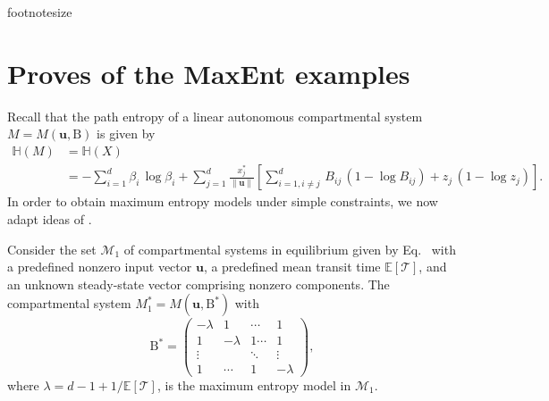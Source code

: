 \documentclass[smallextended]{svjour3}
\makeatletter
\renewcommand*{\eqref}[1]{%
  \hyperref[{#1}]{\textup{\tagform@{\ref*{#1}}}}%
}
\renewcommand{\tens}[1]{\mathrm{#1}}
\renewcommand{\vec}[1]{\mathbf{#1}}
\newcommand{\E}{\mathbb{E}}
\newcommand{\TT}{\mathcal{T}}
\renewcommand{\H}{\mathbb{H}}
\newcommand{\suml}{\sum\limits}
\newcommand{\vnorms}[1]{\|#1\|}
\makeatother
\begin{document}
% 

{footnotesize
}


\appendix


\section{Proves of the MaxEnt examples}
	Recall that the path entropy of a linear autonomous compartmental system $M=M(\vec{u},\tens{B})$ is given by
	\begin{equation}
    \begin{aligned}
      \H(M) &= \H(X)\\
      &= -\suml_{i=1}^d\beta_i\,\log\beta_i + \suml_{j=1}^d \frac{x^\ast_j}{\vnorms{\vec{u}}}\left[\suml_{i=1,i\neq j}^d \,B_{ij}\,(1-\log B_{ij}) + z_j\,(1-\log z_j)\right].
    \end{aligned}
	\end{equation}
	In order to obtain maximum entropy models under simple constraints, we now adapt ideas of \cite{Girardin2004MCAP}.

	\begin{myproposition}
    \label{proposition:max_ent_example_1}
		Consider the set $\mathcal{M}_1$ of compartmental systems in equilibrium given by Eq.~\eqref{eqn:lin_CS_sys}  with a predefined nonzero input vector $\vec{u}$, a predefined mean transit time $\E\left[\TT\right]$, and an unknown steady-state vector comprising nonzero components.
		The compartmental system $M^\ast_1=M(\vec{u},\tens{B}^\ast)$ with 
		\begin{equation}
			\tens{B}^\ast = \begin{pmatrix}
									-\lambda & 1 & \cdots & 1\\
									1 & -\lambda & 1 \cdots & 1 \\
									\vdots & & \ddots & \vdots\\
									1 & \cdots & 1 & -\lambda
             \end{pmatrix},
		\end{equation}
		where $\lambda=d-1+1/\E\left[\TT\right]$, 		
		is the maximum entropy model in $\mathcal{M}_1$.
	\end{myproposition}
\end{document}
